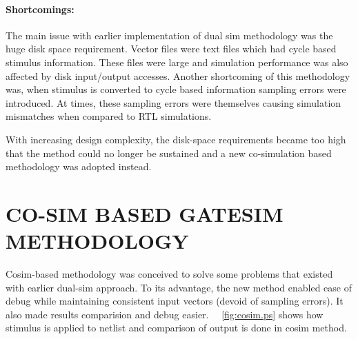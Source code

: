 \paragraph{Shortcomings:}The main issue with earlier implementation of dual sim methodology was the huge disk space requirement. Vector files were text files which had cycle based stimulus information. These files were large and simulation performance was also affected by disk input/output accesses. Another shortcoming of this methodology was, when stimulus is converted to cycle based information sampling errors were introduced. At times, these sampling errors were themselves causing simulation mismatches when compared to RTL simulations.

 
 With increasing design complexity, the disk-space requirements became too high that the method could no longer be sustained and a new co-simulation based methodology was adopted instead.





\section{CO-SIM BASED GATESIM METHODOLOGY}
\label{sec:method:csgs}
 Cosim-based methodology was conceived to solve some problems that existed with earlier dual-sim approach. To its advantage, the new method enabled ease of debug while maintaining consistent input vectors (devoid of sampling errors). It also made results comparision and debug easier. ~\figurename{~\ref{fig:cosim.ps}} shows how stimulus is applied to netlist and comparison of output is done in cosim method. %
 
